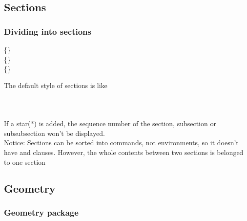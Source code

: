 \subsection{Sections}

\begin{frame}
	\frametitle{Dividing into sections}
	\begin{command}
		\{\}\\
		\{\}\\
		\{\}\\
	\end{command}
	The default style of sections is like\\
	\\
	\\
	\\[0.5em]
	If a star(\alert{*}) is added, the sequence number of the section, subsection or subsubsection won't be displayed.\\
	\alert{Notice:} Sections can be sorted into commands, not environments, so it doesn't have  and  clauses. However, the whole contents between two sections is belonged to one section
\end{frame}

\subsection{Geometry}

\begin{frame}
	\frametitle{Geometry package}
	
\end{frame}